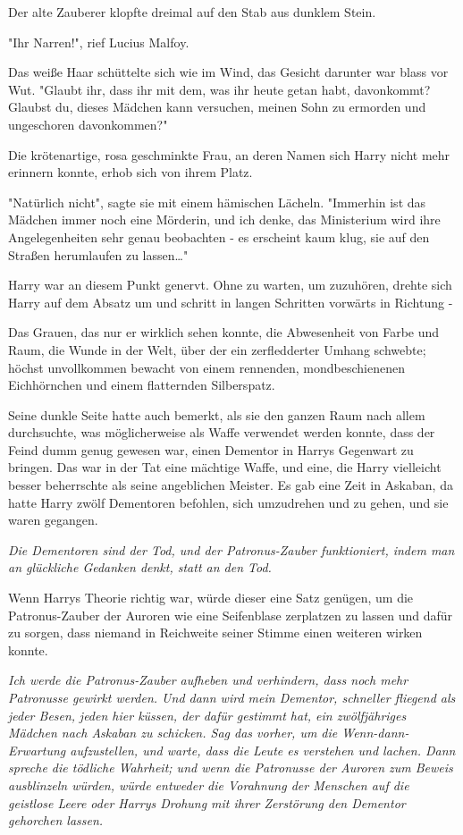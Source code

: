{Der alte Zauberer klopfte dreimal auf den Stab aus dunklem Stein.

"Ihr Narren!", rief Lucius Malfoy.

Das weiße Haar schüttelte sich wie im Wind, das Gesicht darunter war blass vor Wut. "Glaubt ihr, dass ihr mit dem, was ihr heute getan habt, davonkommt? Glaubst du, dieses Mädchen kann versuchen, meinen Sohn zu ermorden und ungeschoren davonkommen?"

Die krötenartige, rosa geschminkte Frau, an deren Namen sich Harry nicht mehr erinnern konnte, erhob sich von ihrem Platz.

"Natürlich nicht", sagte sie mit einem hämischen Lächeln. "Immerhin ist das Mädchen immer noch eine Mörderin, und ich denke, das Ministerium wird ihre Angelegenheiten sehr genau beobachten - es erscheint kaum klug, sie auf den Straßen herumlaufen zu lassen…"

Harry war an diesem Punkt genervt. Ohne zu warten, um zuzuhören, drehte sich Harry auf dem Absatz um und schritt in langen Schritten vorwärts in Richtung -

Das Grauen, das nur er wirklich sehen konnte, die Abwesenheit von Farbe und Raum, die Wunde in der Welt, über der ein zerfledderter Umhang schwebte; höchst unvollkommen bewacht von einem rennenden, mondbeschienenen Eichhörnchen und einem flatternden Silberspatz.

Seine dunkle Seite hatte auch bemerkt, als sie den ganzen Raum nach allem durchsuchte, was möglicherweise als Waffe verwendet werden konnte, dass der Feind dumm genug gewesen war, einen Dementor in Harrys Gegenwart zu bringen. Das war in der Tat eine mächtige Waffe, und eine, die Harry vielleicht besser beherrschte als seine angeblichen Meister. Es gab eine Zeit in Askaban, da hatte Harry zwölf Dementoren befohlen, sich umzudrehen und zu gehen, und sie waren gegangen.

\emph{Die Dementoren sind der Tod, und der Patronus-Zauber funktioniert, indem man an glückliche Gedanken denkt, statt an den Tod.}

Wenn Harrys Theorie richtig war, würde dieser eine Satz genügen, um die Patronus-Zauber der Auroren wie eine Seifenblase zerplatzen zu lassen und dafür zu sorgen, dass niemand in Reichweite seiner Stimme einen weiteren wirken konnte.

\emph{Ich werde die Patronus-Zauber aufheben und verhindern, dass noch mehr Patronusse gewirkt werden. Und dann wird mein Dementor, schneller fliegend als jeder Besen,} \emph{jeden hier küssen, der dafür gestimmt hat, ein zwölfjähriges Mädchen nach Askaban zu schicken. Sag das vorher, um die Wenn-dann-Erwartung aufzustellen, und warte, dass die Leute es verstehen und lachen. Dann spreche die tödliche Wahrheit; und wenn die Patronusse der Auroren zum Beweis ausblinzeln würden, würde entweder die Vorahnung der Menschen auf die geistlose Leere oder Harrys Drohung mit ihrer Zerstörung den Dementor gehorchen lassen.}

}
